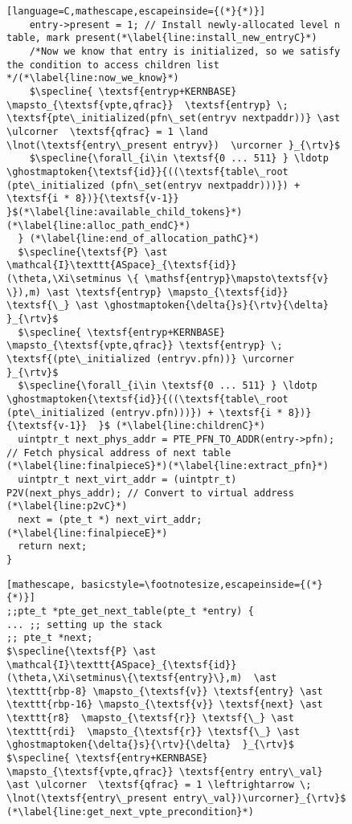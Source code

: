 \begin{figure}
\begin{lstlisting}[language=C,mathescape,escapeinside={(*}{*)}]
    entry->present = 1; // Install newly-allocated level n table, mark present(*\label{line:install_new_entryC}*)
    /*Now we know that entry is initialized, so we satisfy the condition to access children list */(*\label{line:now_we_know}*)
    $\specline{ \textsf{entryp+KERNBASE} \mapsto_{\textsf{vpte,qfrac}}  \textsf{entryp} \; \textsf{pte\_initialized(pfn\_set(entryv nextpaddr))} \ast \ulcorner  \textsf{qfrac} = 1 \land \lnot(\textsf{entry\_present entryv})  \urcorner }_{\rtv}$
    $\specline{\forall_{i\in \textsf{0 ... 511} } \ldotp  \ghostmaptoken{\textsf{id}}{((\textsf{table\_root (pte\_initialized (pfn\_set(entryv nextpaddr)))}) + \textsf{i * 8})}{\textsf{v-1}}  }$(*\label{line:available_child_tokens}*) (*\label{line:alloc_path_endC}*)
  } (*\label{line:end_of_allocation_pathC}*)
  $\specline{\textsf{P} \ast \mathcal{I}\texttt{ASpace}_{\textsf{id}}(\theta,\Xi\setminus \{ \mathsf{entryp}\mapsto\textsf{v} \}),m) \ast \textsf{entryp} \mapsto_{\textsf{id}} \textsf{\_} \ast \ghostmaptoken{\delta{}s}{\rtv}{\delta}  }_{\rtv}$
  $\specline{ \textsf{entryp+KERNBASE} \mapsto_{\textsf{vpte,qfrac}} \textsf{entryp} \; \textsf{(pte\_initialized (entryv.pfn))} \urcorner }_{\rtv}$
  $\specline{\forall_{i\in \textsf{0 ... 511} } \ldotp  \ghostmaptoken{\textsf{id}}{((\textsf{table\_root (pte\_initialized (entryv.pfn)))}) + \textsf{i * 8})}{\textsf{v-1}}  }$ (*\label{line:childrenC}*)
  uintptr_t next_phys_addr = PTE_PFN_TO_ADDR(entry->pfn); // Fetch physical address of next table (*\label{line:finalpieceS}*)(*\label{line:extract_pfn}*)
  uintptr_t next_virt_addr = (uintptr_t) P2V(next_phys_addr); // Convert to virtual address (*\label{line:p2vC}*)
  next = (pte_t *) next_virt_addr;(*\label{line:finalpieceE}*)
  return next;
}
\end{lstlisting}
\else
\begin{lstlisting}[mathescape, basicstyle=\footnotesize,escapeinside={(*}{*)}]
;;pte_t *pte_get_next_table(pte_t *entry) {
... ;; setting up the stack
;; pte_t *next;
$\specline{\textsf{P} \ast \mathcal{I}\texttt{ASpace}_{\textsf{id}}(\theta,\Xi\setminus\{\textsf{entry}\},m)  \ast \texttt{rbp-8} \mapsto_{\textsf{v}} \textsf{entry} \ast  \texttt{rbp-16} \mapsto_{\textsf{v}} \textsf{next} \ast \texttt{r8}  \mapsto_{\textsf{r}} \textsf{\_} \ast \texttt{rdi}  \mapsto_{\textsf{r}} \textsf{\_} \ast \ghostmaptoken{\delta{}s}{\rtv}{\delta}  }_{\rtv}$
$\specline{ \textsf{entry+KERNBASE} \mapsto_{\textsf{vpte,qfrac}} \textsf{entry entry\_val} \ast \ulcorner  \textsf{qfrac} = 1 \leftrightarrow \; \lnot(\textsf{entry\_present entry\_val})\urcorner}_{\rtv}$ (*\label{line:get_next_vpte_precondition}*)

\end{lstlisting}
\end{figure}
